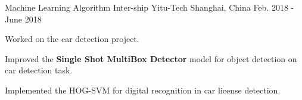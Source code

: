 \begin{cventries}
\cventry
    {Machine Learning Algorithm Inter-ship} %
    {Yitu-Tech} %
    {Shanghai, China} %
    {Feb. 2018 - June 2018} %
    {
      \begin{cvitems} %
       \item {Worked on the car detection project.}
        \item {Improved the \textbf{Single Shot MultiBox Detector} model for object detection on car detection task.}
        \item {Implemented the HOG-SVM for digital recognition in car license detection.}
      \end{cvitems}
    }
        
\end{cventries}
